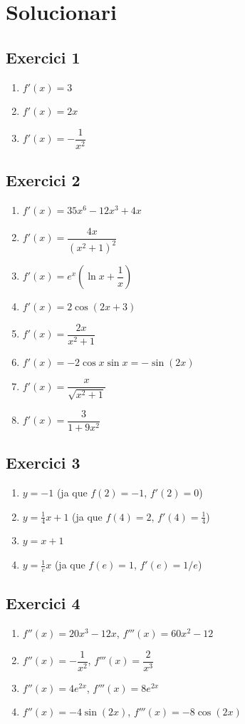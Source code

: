 \documentclass[12pt]{article}
\begin{document}
\newpage

\section*{Solucionari}

\subsection*{Exercici 1}
\begin{enumerate}[label=\alph*)]
    \item $f'(x)=3$
    \item $f'(x)=2x$
    \item $f'(x)=-\dfrac{1}{x^2}$
\end{enumerate}

\subsection*{Exercici 2}
\begin{enumerate}[label=\alph*)]
    \item $f'(x)=35x^6-12x^3+4x$
    \item $f'(x)=\dfrac{4x}{(x^2+1)^2}$
    \item $f'(x)=e^x\left(\ln x+\dfrac{1}{x}\right)$
    \item $f'(x)=2\cos(2x+3)$
    \item $f'(x)=\dfrac{2x}{x^2+1}$
    \item $f'(x)=-2\cos x\sin x = -\sin(2x)$
    \item $f'(x)=\dfrac{x}{\sqrt{x^2+1}}$
    \item $f'(x)=\dfrac{3}{1+9x^2}$
\end{enumerate}

\subsection*{Exercici 3}
\begin{enumerate}[label=\alph*)]
    \item $y=-1$  (ja que $f(2)=-1$, $f'(2)=0$)
    \item $y=\frac{1}{4}x+1$ (ja que $f(4)=2$, $f'(4)=\frac{1}{4}$)
    \item $y=x+1$
    \item $y=\frac{1}{e}x$ (ja que $f(e)=1$, $f'(e)=1/e$)
\end{enumerate}

\subsection*{Exercici 4}
\begin{enumerate}[label=\alph*)]
    \item $f''(x)=20x^3-12x$, $f'''(x)=60x^2-12$
    \item $f''(x)=-\dfrac{1}{x^2}$, $f'''(x)=\dfrac{2}{x^3}$
    \item $f''(x)=4e^{2x}$, $f'''(x)=8e^{2x}$
    \item $f''(x)=-4\sin(2x)$, $f'''(x)=-8\cos(2x)$
\end{enumerate}
\end{document}
